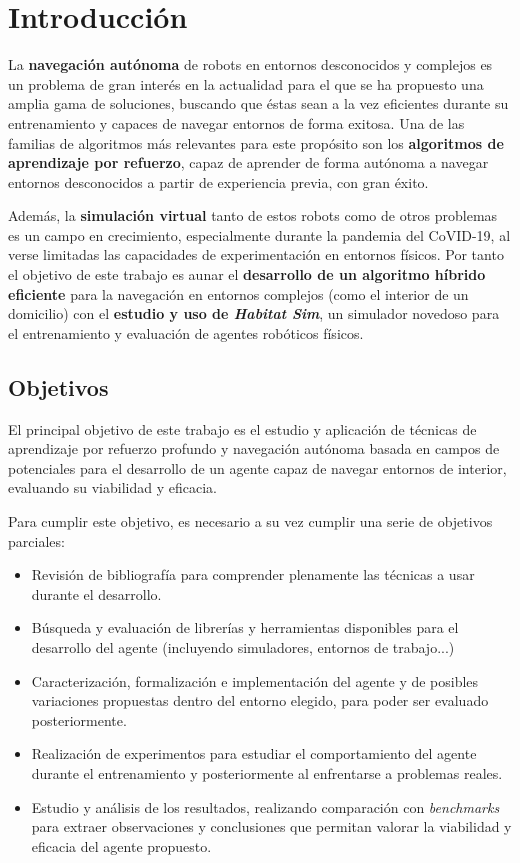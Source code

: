 \chapter{Introducción}

La \textbf{navegación autónoma} de robots en entornos desconocidos y complejos es un problema de gran interés en la actualidad para el que se ha propuesto una amplia gama de soluciones, buscando que éstas sean a la vez eficientes durante su entrenamiento y capaces de navegar entornos de forma exitosa. Una de las familias de algoritmos más relevantes para este propósito son los \textbf{algoritmos de aprendizaje por refuerzo}, capaz de aprender de forma autónoma a navegar entornos desconocidos a partir de experiencia previa, con gran éxito.

Además, la \textbf{simulación virtual} tanto de estos robots como de otros problemas es un campo en crecimiento, especialmente durante la pandemia del CoVID-19, al verse limitadas las capacidades de experimentación en entornos físicos.  Por tanto el objetivo de este trabajo es aunar el \textbf{desarrollo de un algoritmo híbrido eficiente} para la navegación en entornos complejos (como el interior de un domicilio) con el \textbf{estudio y uso de \textit{Habitat Sim}}, un simulador novedoso para el entrenamiento y evaluación de agentes robóticos físicos.

\section{Objetivos}

El principal objetivo de este trabajo es el estudio y aplicación de técnicas de aprendizaje por refuerzo profundo y navegación autónoma basada en campos de potenciales para el desarrollo de un agente capaz de navegar entornos de interior, evaluando su viabilidad y eficacia.

Para cumplir este objetivo, es necesario a su vez cumplir una serie de objetivos parciales:

\begin{itemize}
	\item Revisión de bibliografía para comprender plenamente las técnicas a usar durante el desarrollo.
	\item Búsqueda y evaluación de librerías y herramientas disponibles para el desarrollo del agente (incluyendo simuladores, entornos de trabajo...)
	\item Caracterización, formalización e implementación del agente y de posibles variaciones propuestas dentro del entorno elegido, para poder ser evaluado posteriormente.
	\item Realización de experimentos para estudiar el comportamiento del agente durante el entrenamiento y posteriormente al enfrentarse a problemas reales.
	\item Estudio y análisis de los resultados, realizando comparación con \textit{benchmarks} para extraer observaciones y conclusiones que permitan valorar la viabilidad y eficacia del agente propuesto.
\end{itemize}

